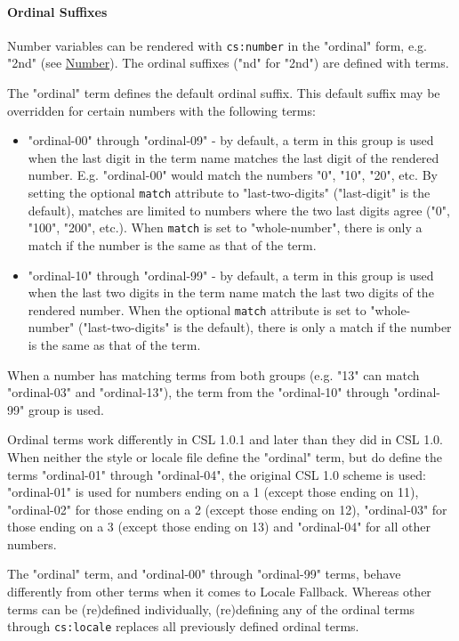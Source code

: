 \hypertarget{ordinal-suffixes}{%
\paragraph{Ordinal Suffixes}\label{ordinal-suffixes}}

Number variables can be rendered with \texttt{cs:number} in the
"ordinal" form, e.g. "2nd" (see \protect\hyperlink{number}{Number}). The
ordinal suffixes ("nd" for "2nd") are defined with terms.

The "ordinal" term defines the default ordinal suffix. This default
suffix may be overridden for certain numbers with the following terms:

\begin{itemize}
\tightlist
\item
  "ordinal-00" through "ordinal-09" - by default, a term in this group
  is used when the last digit in the term name matches the last digit of
  the rendered number. E.g. "ordinal-00" would match the numbers "0",
  "10", "20", etc. By setting the optional \texttt{match} attribute to
  "last-two-digits" ("last-digit" is the default), matches are limited
  to numbers where the two last digits agree ("0", "100", "200", etc.).
  When \texttt{match} is set to "whole-number", there is only a match if
  the number is the same as that of the term.
\item
  "ordinal-10" through "ordinal-99" - by default, a term in this group
  is used when the last two digits in the term name match the last two
  digits of the rendered number. When the optional \texttt{match}
  attribute is set to "whole-number" ("last-two-digits" is the default),
  there is only a match if the number is the same as that of the term.
\end{itemize}

When a number has matching terms from both groups (e.g. "13" can match
"ordinal-03" and "ordinal-13"), the term from the "ordinal-10" through
"ordinal-99" group is used.

Ordinal terms work differently in CSL 1.0.1 and later than they did in
CSL 1.0. When neither the style or locale file define the "ordinal"
term, but do define the terms "ordinal-01" through "ordinal-04", the
original CSL 1.0 scheme is used: "ordinal-01" is used for numbers ending
on a 1 (except those ending on 11), "ordinal-02" for those ending on a 2
(except those ending on 12), "ordinal-03" for those ending on a 3
(except those ending on 13) and "ordinal-04" for all other numbers.

The "ordinal" term, and "ordinal-00" through "ordinal-99" terms, behave
differently from other terms when it comes to {Locale Fallback}. Whereas
other terms can be (re)defined individually, (re)defining any of the
ordinal terms through \texttt{cs:locale} replaces all previously defined
ordinal terms.

